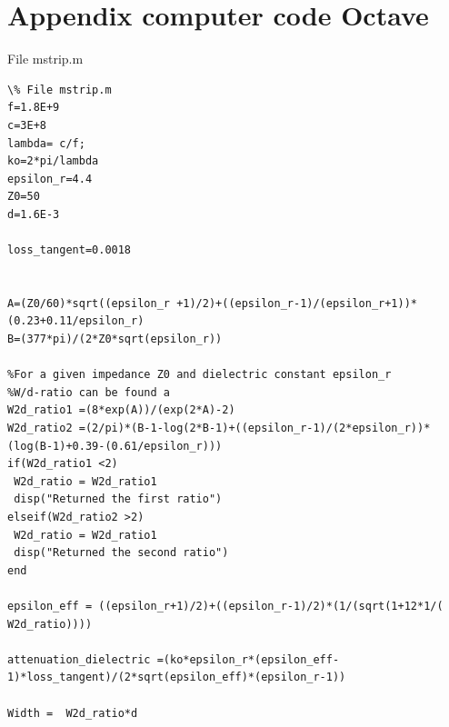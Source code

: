 \documentclass{article}
\begin{document}
\section{Appendix computer code Octave}
File mstrip.m
\begin{verbatim}
\% File mstrip.m
f=1.8E+9
c=3E+8
lambda= c/f;
ko=2*pi/lambda
epsilon_r=4.4
Z0=50
d=1.6E-3

loss_tangent=0.0018


A=(Z0/60)*sqrt((epsilon_r +1)/2)+((epsilon_r-1)/(epsilon_r+1))*(0.23+0.11/epsilon_r)
B=(377*pi)/(2*Z0*sqrt(epsilon_r))

%For a given impedance Z0 and dielectric constant epsilon_r
%W/d-ratio can be found a
W2d_ratio1 =(8*exp(A))/(exp(2*A)-2)
W2d_ratio2 =(2/pi)*(B-1-log(2*B-1)+((epsilon_r-1)/(2*epsilon_r))*(log(B-1)+0.39-(0.61/epsilon_r)))
if(W2d_ratio1 <2)
 W2d_ratio = W2d_ratio1
 disp("Returned the first ratio")
elseif(W2d_ratio2 >2)
 W2d_ratio = W2d_ratio1
 disp("Returned the second ratio")
end

epsilon_eff = ((epsilon_r+1)/2)+((epsilon_r-1)/2)*(1/(sqrt(1+12*1/( W2d_ratio))))

attenuation_dielectric =(ko*epsilon_r*(epsilon_eff-1)*loss_tangent)/(2*sqrt(epsilon_eff)*(epsilon_r-1))

Width =  W2d_ratio*d


\end{verbatim}
\end{document}
